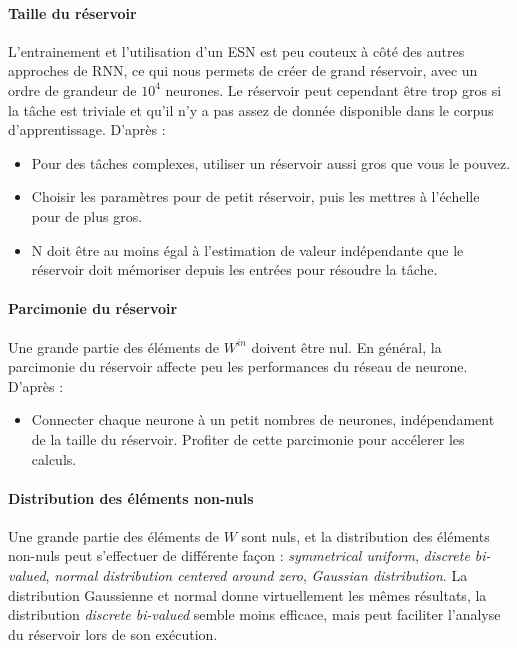 \documentclass[12pt]{article}
\begin{document}
\paragraph{Taille du réservoir}
L'entrainement et l'utilisation d'un ESN est peu couteux à côté des autres approches de RNN, ce qui nous permets de créer de grand réservoir, avec un ordre de grandeur de $10^{4}$ neurones. Le réservoir peut cependant être trop gros si la tâche est triviale et qu'il n'y a pas assez de donnée disponible dans le corpus d'apprentissage.\newline
D'après \cite{Lukosevicius12}:
\begin{itemize}
\item Pour des tâches complexes, utiliser un réservoir aussi gros que vous le pouvez.
\item Choisir les paramètres pour de petit réservoir, puis les mettres à l'échelle pour de plus gros.
\item N doit être au moins égal à l'estimation de valeur indépendante que le réservoir doit mémoriser depuis les entrées pour résoudre la tâche.
\end{itemize}

\paragraph{Parcimonie du réservoir}
Une grande partie des éléments de $W^{in}$ doivent être nul. En général, la parcimonie du réservoir affecte peu les performances du réseau de neurone.\newline
D'après \cite{Lukosevicius12}:
\begin{itemize}
\item Connecter chaque neurone à un petit nombres de neurones, indépendament de la taille du réservoir. Profiter de cette parcimonie pour accélerer les calculs.
\end{itemize}

\paragraph{Distribution des éléments non-nuls}
Une grande partie des éléments de $W$ sont nuls, et la distribution des éléments non-nuls peut s'effectuer de différente façon : \textit{symmetrical uniform}, \textit{discrete bi-valued}, \textit{normal distribution centered around zero}, \textit{Gaussian distribution}.\newline
La distribution Gaussienne et normal donne virtuellement les mêmes résultats, la distribution \textit{discrete bi-valued} semble moins efficace, mais peut faciliter l'analyse du réservoir lors de son exécution.
\end{document}
